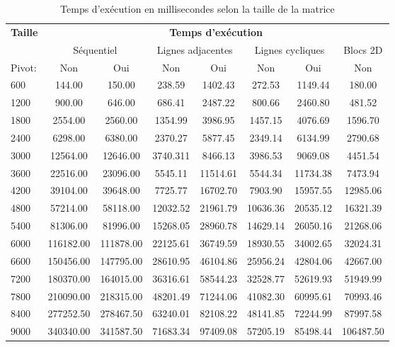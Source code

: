 \documentclass[12pt,letterpaper]{article} %
\begin{document}
\begin{table}[h!]
 \centering
\begin{tabular}{|l|c|c|c|c|c|c|c|}
\hline
\multirow{2}{*}{\bf{Taille}}& \multicolumn{7}{|c|}{\bf{Temps d'exécution}} \\ \cline{2-8}
&\multicolumn{2}{|c|}{Séquentiel} & \multicolumn{2}{|c|}{Lignes adjacentes} &
\multicolumn{2}{|c|}{Lignes cycliques} & Blocs 2D \\ \hline
Pivot: & Non & Oui & Non & Oui & Non & Oui & Non \\ \hline
600 &144.00 &150.00&238.59&1402.43&272.53&1149.44&180.00 \\ \hline
1200&900.00&646.00&686.41&2487.22&800.66&2460.80&481.52 \\ \hline
1800&2554.00&2560.00&1354.99&3986.95&1457.15&4076.69&1596.70 \\ \hline
2400&6298.00&6380.00&2370.27&5877.45&2349.14&6134.99&2790.68 \\ \hline
3000&12564.00&12646.00&3740.311&8466.13&3986.53&9069.08&4451.54 \\ \hline
3600&22516.00&23096.00&5545.11&11514.61&5544.34&11734.38&7473.94 \\ \hline
4200&39104.00&39648.00&7725.77&16702.70&7903.90&15957.55&12985.06 \\ \hline
4800&57214.00&58118.00&12032.52&21961.79&10636.36&20535.12&16321.39\\ \hline
5400&81306.00&81996.00&15268.05&28960.78&14629.14&26050.16&21268.06\\ \hline
6000&116182.00&111878.00&22125.61&36749.59&18930.55&34002.65&32024.31\\ \hline
6600&150456.00&147795.00&28610.95&46104.86&25956.24&42804.06&42667.00\\ \hline
7200&180370.00&164015.00&36316.61&58544.23&32528.77&52619.93&51949.99\\ \hline
7800&210090.00&218315.00&48201.49&71244.06&41082.30&60995.61&70993.46\\ \hline
8400&277252.50&278467.50&63240.01&82108.22&48141.85&72244.99&87997.58\\ \hline
9000&340340.00&341587.50&71683.34&97409.08&57205.19&85498.44&106487.50\\ \hline
\end{tabular}
\caption{\label{1}Temps d'exécution en millisecondes selon la taille de la matrice}
\end{table}
\end{document}
